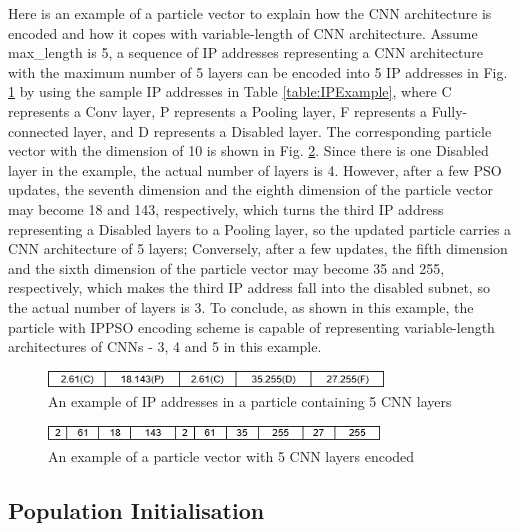 \documentclass[conference]{IEEEtran}
\begin{document}
Here is an example of a particle vector to explain how the CNN architecture is encoded and how it copes with variable-length of CNN architecture. Assume max\_length is 5, a sequence of IP addresses representing a CNN architecture with the maximum number of 5 layers can be encoded into 5 IP addresses in Fig. \ref{fig:ParticleIP} by using the sample IP addresses in Table \ref{table:IPExample}, where C represents a Conv layer, P represents a Pooling layer, F represents a Fully-connected layer, and D represents a Disabled layer. The corresponding particle vector with the dimension of 10 is shown in Fig. \ref{fig:ParticleVector}. Since there is one Disabled layer in the example, the actual number of layers is 4. However, after a few PSO updates, the seventh dimension and the eighth dimension of the particle vector may become 18 and 143, respectively, which turns the third IP address representing a Disabled layers to a Pooling layer, so the updated particle carries a CNN architecture of 5 layers; Conversely, after a few updates, the fifth dimension and the sixth dimension of the particle vector may become 35 and 255, respectively, which makes the third IP address fall into the disabled subnet, so the actual number of layers is 3. To conclude, as shown in this example, the particle with IPPSO encoding scheme is capable of representing variable-length architectures of CNNs - 3, 4 and 5 in this example. 


\begin{figure}[!t]
	\centering
	\includegraphics[width=3.5in]{ippso-encoding-i}
	\caption{An example of IP addresses in a particle containing 5 CNN layers}
	\label{fig:ParticleIP}
\end{figure}

\begin{figure}[!t]
	\centering
	\includegraphics[width=3.5in]{ippso-encoding-v}
	\caption{An example of a particle vector with 5 CNN layers encoded}
	\label{fig:ParticleVector}
\end{figure}

\subsection{Population Initialisation}
\end{document}
